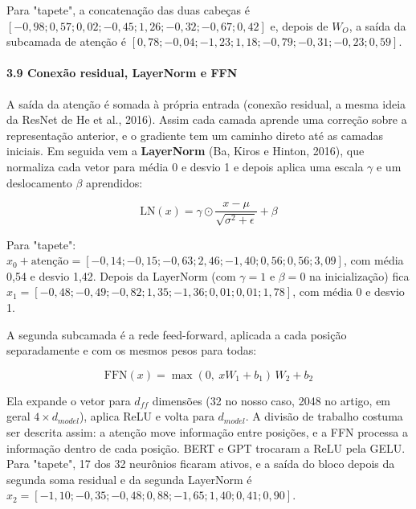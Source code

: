 \documentclass[12pt, a4paper]{article}
\begin{document}
Para "tapete", a concatenação das duas cabeças é \([-0{,}98;\allowbreak 0{,}57;\allowbreak 0{,}02;\allowbreak -0{,}45;\allowbreak 1{,}26;\allowbreak -0{,}32;\allowbreak -0{,}67;\allowbreak 0{,}42]\) e, depois de \(W_O\), a saída da subcamada de atenção é \([0{,}78;\allowbreak -0{,}04;\allowbreak -1{,}23;\allowbreak 1{,}18;\allowbreak -0{,}79;\allowbreak -0{,}31;\allowbreak -0{,}23;\allowbreak 0{,}59]\).

\paragraph{3.9 Conexão residual, LayerNorm e FFN}\label{39-conexuxe3o-residual-layernorm-e-ffn}

A saída da atenção é somada à própria entrada (conexão residual, a mesma ideia da ResNet de He et al., 2016). Assim cada camada aprende uma correção sobre a representação anterior, e o gradiente tem um caminho direto até as camadas iniciais. Em seguida vem a \textbf{LayerNorm} (Ba, Kiros e Hinton, 2016), que normaliza cada vetor para média 0 e desvio 1 e depois aplica uma escala \(\gamma\) e um deslocamento \(\beta\) aprendidos:

\[\text{LN}(x) = \gamma \odot \frac{x - \mu}{\sqrt{\sigma^2 + \epsilon}} + \beta\]

Para "tapete": \(x_0 + \text{atenção} = [-0{,}14;\allowbreak -0{,}15;\allowbreak -0{,}63;\allowbreak 2{,}46;\allowbreak -1{,}40;\allowbreak 0{,}56;\allowbreak 0{,}56;\allowbreak 3{,}09]\), com média 0,54 e desvio 1,42. Depois da LayerNorm (com \(\gamma=1\) e \(\beta=0\) na inicialização) fica \(x_1 = [-0{,}48;\allowbreak -0{,}49;\allowbreak -0{,}82;\allowbreak 1{,}35;\allowbreak -1{,}36;\allowbreak 0{,}01;\allowbreak 0{,}01;\allowbreak 1{,}78]\), com média 0 e desvio 1.

A segunda subcamada é a rede feed-forward, aplicada a cada posição separadamente e com os mesmos pesos para todas:

\[\text{FFN}(x) = \max(0,\ xW_1 + b_1)\, W_2 + b_2\]

Ela expande o vetor para \(d_{ff}\) dimensões (32 no nosso caso, 2048 no artigo, em geral \(4 \times d_{model}\)), aplica ReLU e volta para \(d_{model}\). A divisão de trabalho costuma ser descrita assim: a atenção move informação entre posições, e a FFN processa a informação dentro de cada posição. BERT e GPT trocaram a ReLU pela GELU. Para "tapete", 17 dos 32 neurônios ficaram ativos, e a saída do bloco depois da segunda soma residual e da segunda LayerNorm é \(x_2 = [-1{,}10;\allowbreak -0{,}35;\allowbreak -0{,}48;\allowbreak 0{,}88;\allowbreak -1{,}65;\allowbreak 1{,}40;\allowbreak 0{,}41;\allowbreak 0{,}90]\).
\end{document}
